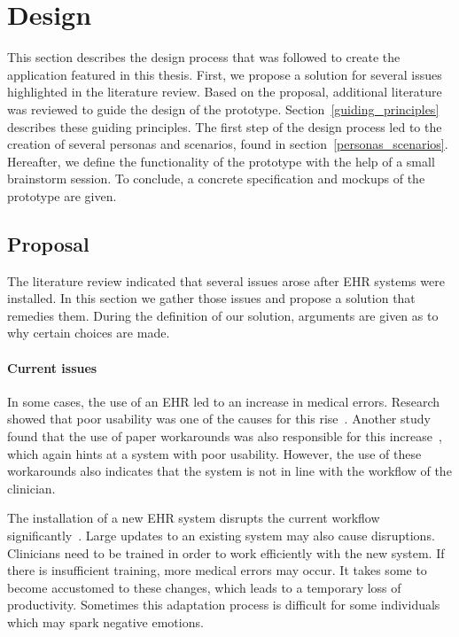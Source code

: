 \section{Design}\label{design}

This section describes the design process that was followed to create the application featured in this thesis. First, we propose a solution for several issues highlighted in the literature review. Based on the proposal, additional literature was reviewed to guide the design of the prototype. Section~\ref{guiding_principles} describes these guiding principles. The first step of the design process led to the creation of several personas and scenarios, found in section~\ref{personas_scenarios}. Hereafter, we define the functionality of the prototype with the help of a small brainstorm session. To conclude, a concrete specification and mockups of the prototype are given.

    \subsection{Proposal}
    
    The literature review indicated that several issues arose after EHR systems were installed. In this section we gather those issues and propose a solution that remedies them. During the definition of our solution, arguments are given as to why certain choices are made.

    \paragraph{Current issues} In some cases, the use of an EHR led to an increase in medical errors. Research showed that poor usability was one of the causes for this rise~\cite{Koppel2005}. Another study found that the use of paper workarounds was also responsible for this increase~\cite{Saleem2009}, which again hints at a system with poor usability. However, the use of these workarounds also indicates that the system is not in line with the workflow of the clinician.

    The installation of a new EHR system disrupts the current workflow significantly~\cite{Menachemi2011}. Large updates to an existing system may also cause disruptions. Clinicians need to be trained in order to work efficiently with the new system. If there is insufficient training, more medical errors may occur. It takes some to become accustomed to these changes, which leads to a temporary loss of productivity. Sometimes this adaptation process is difficult for some individuals which may spark negative emotions.

